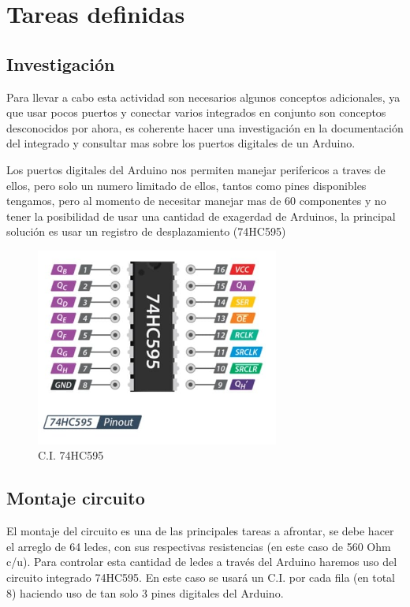 \documentclass{article}
\begin{document}
\section{Tareas definidas} \label{contenido}
\subsection{Investigación}
Para llevar a cabo esta actividad son necesarios algunos conceptos adicionales, ya que usar pocos puertos y conectar varios integrados en conjunto son conceptos desconocidos por ahora, es coherente hacer una investigación en la documentación del integrado y consultar mas sobre los puertos digitales de un Arduino.

Los puertos digitales del Arduino nos permiten manejar perifericos a traves de ellos, pero solo un numero limitado de ellos, tantos como pines disponibles tengamos, pero al momento de necesitar manejar mas de 60 componentes y no tener la posibilidad de usar una cantidad de exagerdad de Arduinos, la principal solución es usar un registro de desplazamiento (74HC595)

\begin{figure}[H]
\includegraphics[width=8cm]{pinout-74HC595.jpg}
\centering
\caption{C.I. 74HC595}
\label{fig:chip}
\end{figure}

\subsection{Montaje circuito}
El montaje del circuito es una de las principales tareas a afrontar, se debe hacer el arreglo de 64 ledes, con sus respectivas resistencias (en este caso de 560 Ohm c/u). Para controlar esta cantidad de ledes a través del Arduino haremos uso del circuito integrado 74HC595. En este caso se usará un C.I. por cada fila (en total 8) haciendo uso de tan solo 3 pines digitales del Arduino.
\end{document}
